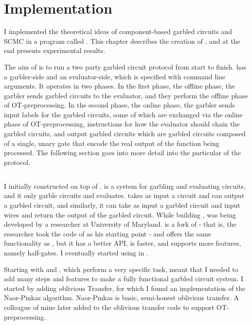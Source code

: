 
\chapter{Implementation}

I implemented the theoretical ideas of component-based garbled circuits and SCMC in a program called \CompGC. 
This chapter describes the creation of \CompGC, and at the end presents experimental results. 

The aim of \CompGC is to run a two party garbled circuit protocol from start to finish. 
\CompGC has a garbler-side and an evaluator-side, which is specified with command line arguments.
It operates in two phases.
In the first phase, the offline phase, the garbler sends garbled circuits to the evaluator, and they perform the offline phase of OT-preprocessing.
In the second phase, the online phase, the garbler sends input labels for the garbled circuits, some of which are exchanged via the online phase of OT-preprocessing, instructions for how the evaluator should chain the garbled circuits, and output garbled circuits which are garbled circuits composed of a single, unary gate that encode the real output of the function being processed.
The following section goes into more detail into the particular of the \CompGC protocol.

\section{\CompGC}
I initially constructed \CompGC on top of \JustGarble.
\JustGarble is a system for garbling and evaluating circuits, and it only garble circuits and evaluates.
\JustGarble takes as input a circuit and can output a garbled circuit, and similarly, it can take as input a garbled circuit and input wires and return the output of the garbled circuit.
While building \CompGC, \LibGarble was being developed by a researcher at University of Maryland.
\LibGarble is a fork of \JustGarble - that is, the researcher took the code of \JustGarble as his starting point -  and offers the same functionality as \JustGarble, but it has a better API, is faster, and supports more features, namely half-gates.
I eventually started using \LibGarble in \CompGC.

Starting with \JustGarble and \LibGarble, which perform a very specific task, meant that I needed to add many steps and features to make a fully functional garbled circuit system.
I started by adding oblivious Transfer, for which I found an implementation of the Naor-Pinkas algorithm.
Naor-Pinkas is basic, semi-honest oblivious transfer.
A colleague of mine later added to the oblivious transfer code to support OT-preprocessing.


